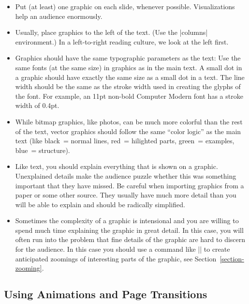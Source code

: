 \begin{itemize}
\item
  Put (at least) one graphic on each slide, whenever
  possible. Visualizations help an audience enormously.
\item
  Usually, place graphics to the left of the text. (Use the
  |columns| environment.) In a left-to-right reading culture, we look
  at the left first.
\item
  Graphics should have the same typographic parameters as the
  text: Use the same fonts (at the same size) in graphics as in the
  main text. A small dot in a graphic should have exactly the same 
  size as a small dot in a text. The line width should be the same as
  the stroke width used in creating the glyphs of the font. For
  example, an 11pt non-bold Computer Modern font has a stroke width of
  0.4pt.
\item
  While bitmap graphics, like photos, can be much more colorful than the
  rest of the text, vector graphics should follow the same ``color
  logic'' as the main text (like black~= normal lines, red~= hilighted
  parts, green~= examples, blue~= structure).
\item
  Like text, you should explain everything that is shown on a
  graphic. Unexplained details make the audience puzzle whether this
  was something important that they have missed. Be careful when
  importing graphics from a paper or some other source. They usually
  have much more detail than you will be able to explain and should be
  radically simplified.
\item
  Sometimes the complexity of a graphic is intensional and you
  are willing to spend much time explaining the graphic in great
  detail. In this case, you will often run into the problem that fine
  details of the graphic are hard to discern for the audience. In this
  case you should use a command like |\framezoom| to create
  anticipated zoomings of interesting parts of the graphic, see
  Section~\ref{section-zooming}. 
\end{itemize}



\subsection{Using Animations and Page Transitions}

